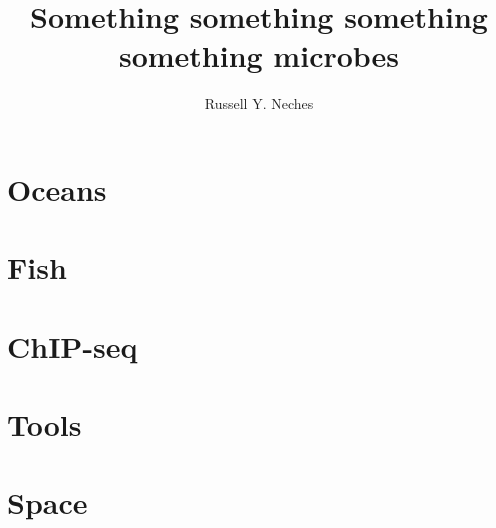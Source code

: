 \documentclass[PhD]{ucdavisthesis}
\title{Something something something something microbes}
\author{Russell Y. Neches}
\begin{document}
\makeintropages

\part{Oceans}





\part{Fish}




\part{ChIP-seq}




\part{Tools}




\part{Space}



\end{document}
